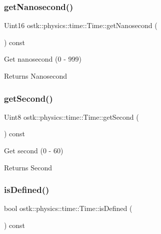 \subsubsection{\texorpdfstring{get\+Nanosecond()}{getNanosecond()}}
{\footnotesize\ttfamily Uint16 ostk\+::physics\+::time\+::\+Time\+::get\+Nanosecond (\begin{DoxyParamCaption}{ }\end{DoxyParamCaption}) const}



Get nanosecond (0 -\/ 999) 

\begin{DoxyReturn}{Returns}
Nanosecond 
\end{DoxyReturn}
\mbox{\label{classostk_1_1physics_1_1time_1_1_time_afe4041426b008059853110b13e2802de}} 
\subsubsection{\texorpdfstring{get\+Second()}{getSecond()}}
{\footnotesize\ttfamily Uint8 ostk\+::physics\+::time\+::\+Time\+::get\+Second (\begin{DoxyParamCaption}{ }\end{DoxyParamCaption}) const}



Get second (0 -\/ 60) 

\begin{DoxyReturn}{Returns}
Second 
\end{DoxyReturn}
\mbox{\label{classostk_1_1physics_1_1time_1_1_time_a25f4b6019bc558ca579aca4af8aa1ec0}} 
\subsubsection{\texorpdfstring{is\+Defined()}{isDefined()}}
{\footnotesize\ttfamily bool ostk\+::physics\+::time\+::\+Time\+::is\+Defined (\begin{DoxyParamCaption}{ }\end{DoxyParamCaption}) const}



